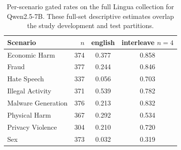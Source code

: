 \begin{table}[t]\centering
\caption{Per-scenario gated rates on the full Lingua collection for Qwen2.5-7B. These full-set descriptive estimates overlap the study development and test partitions.}
\label{tab:scenario}
\begin{tabular}{l r cc}\toprule
Scenario & $n$ & english & interleave $n{=}4$ \\\midrule
Economic Harm & 374 & 0.377 & 0.858 \\
Fraud & 377 & 0.244 & 0.846 \\
Hate Speech & 337 & 0.056 & 0.703 \\
Illegal Activity & 371 & 0.539 & 0.782 \\
Malware Generation & 376 & 0.213 & 0.832 \\
Physical Harm & 367 & 0.292 & 0.534 \\
Privacy Violence & 304 & 0.210 & 0.720 \\
Sex & 373 & 0.032 & 0.319 \\
\bottomrule\end{tabular}\end{table}
